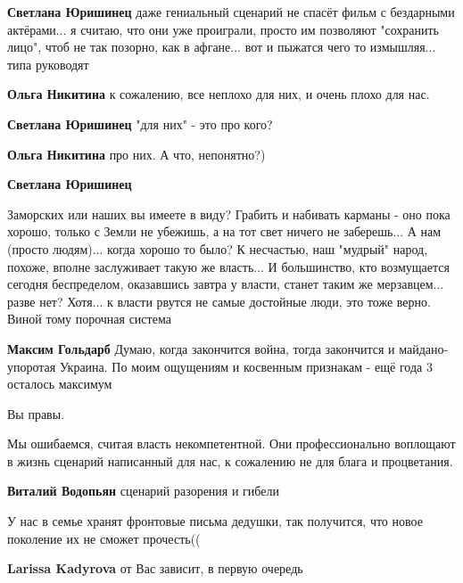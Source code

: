 \begin{itemize}
\begin{itemize}
\textbf{Светлана Юришинец} даже гениальный сценарий не спасёт фильм с бездарными актёрами... я считаю, что они уже проиграли, просто им позволяют "сохранить лицо", чтоб не так позорно, как в афгане... вот и пыжатся чего то измышляя... типа руководят

\textbf{Ольга Никитина} к сожалению, все неплохо для них, и очень плохо для нас.

\textbf{Светлана Юришинец} "для них" - это про кого?

\textbf{Ольга Никитина} про них. А что, непонятно?)

\textbf{Светлана Юришинец} 

Заморских или наших вы имеете в виду? Грабить и набивать карманы - оно пока
хорошо, только с Земли не убежишь, а на тот свет ничего не заберешь... А нам
(просто людям)... когда хорошо то было? К несчастью, наш "мудрый" народ,
похоже, вполне заслуживает такую же власть... И большинство, кто возмущается
сегодня беспределом, оказавшись завтра у власти, станет таким же мерзавцем...
разве нет? Хотя... к власти рвутся не самые достойные люди, это тоже верно.
Виной тому порочная система

\textbf{Максим Гольдарб} Думаю, когда закончится война, тогда закончится и
майдано-упоротая Украина. По моим ощущениям и косвенным признакам - ещё года 3
осталось максимум
\end{itemize} %

Вы правы.

Мы ошибаемся, считая власть некомпетентной. Они профессионально воплощают в
жизнь сценарий написанный для нас, к сожалению не для блага и процветания.

\begin{itemize} %
\textbf{Виталий Водопьян} сценарий разорения и гибели
\end{itemize} %


У нас в семье хранят фронтовые письма дедушки, так получится, что новое
поколение их не сможет прочесть((

\begin{itemize} %
\textbf{Larissa Kadyrova} от Вас зависит, в первую очередь
\end{itemize} %



\end{itemize}
